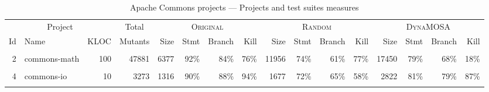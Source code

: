 \documentclass[sigconf]{acmart}
\newcommand{\original}{\textsc{Original}\xspace}
\begin{document}
\begin{table}
\small
  \caption{Apache Commons projects --- Projects and test suites measures}
  \begin{tabular}{|r| l | r | r | r|r|r|r | r|r|r|r | r|r|r|r |}
    \hline
    \multicolumn{3}{|c|}{Project} & 
    \multicolumn{1}{c|}{Total} & 
    \multicolumn{4}{c|}{\original}  & 
    \multicolumn{4}{c|}{\textsc{Random}} &
    \multicolumn{4}{c|}{\textsc{DynaMOSA}}\\

    Id &     Name &    KLOC &
    Mutants &
    Size & Stmt & Branch & Kill &
    Size & Stmt & Branch & Kill &
    Size & Stmt & Branch & Kill \\
    \hline
\cellcolor[HTML]{FFFF00}{1} & \cellcolor[HTML]{FFFF00}{commons-net}             & \cellcolor[HTML]{FFFF00}{20}	  & \cellcolor[HTML]{FFFF00}{5764}	&	\cellcolor[HTML]{FFFF00}{254}		& \cellcolor[HTML]{FFFF00}{33\%} & \cellcolor[HTML]{FFFF00}{28\%} & \cellcolor[HTML]{FFFF00}{28\%}  & \cellcolor[HTML]{FFFF00}{1988}	& \cellcolor[HTML]{FFFF00}{48\%} & \cellcolor[HTML]{FFFF00}{35\%} & \cellcolor[HTML]{FFFF00}{32\%} & \cellcolor[HTML]{FFFF00}{3499}	  & \cellcolor[HTML]{FFFF00}{51\%} & \cellcolor[HTML]{FFFF00}{42\%} & \cellcolor[HTML]{FFFF00}{35\%}\\
2 & commons-math            & 100	  & 47881	& 6377	& 92\% & 84\% & 76\%  & 11956	& 74\% & 61\% & 77\% & 17450	& 79\% & 68\% & 18\% \\
\cellcolor[HTML]{FFFF00}{3} & \cellcolor[HTML]{FFFF00}{commons-lang}            & \cellcolor[HTML]{FFFF00}{28} 		& \cellcolor[HTML]{FFFF00}{13061}	& \cellcolor[HTML]{FFFF00}{4114}	& \cellcolor[HTML]{FFFF00}{95\%} & \cellcolor[HTML]{FFFF00}{91\%} & \cellcolor[HTML]{FFFF00}{66\%}  & \cellcolor[HTML]{FFFF00}{4500}	& \cellcolor[HTML]{FFFF00}{73\%} & \cellcolor[HTML]{FFFF00}{60\%} & \cellcolor[HTML]{FFFF00}{72\%} & \cellcolor[HTML]{FFFF00}{9027}	  & \cellcolor[HTML]{FFFF00}{89\%} & \cellcolor[HTML]{FFFF00}{86\%} & \cellcolor[HTML]{FFFF00}{86\%} \\
4 & commons-io              & 10 	  & 3273	&	1316	& 90\% & 88\% & 94\%  & 1677	& 72\% & 65\% & 58\% & 2822	  & 81\% & 79\% & 87\% \\
\cellcolor[HTML]{FFFF00}{5} & \cellcolor[HTML]{FFFF00}{commons-imaging}         & \cellcolor[HTML]{FFFF00}{31} 	  & \cellcolor[HTML]{FFFF00}{11597}	&	\cellcolor[HTML]{FFFF00}{563}		& \cellcolor[HTML]{FFFF00}{73\%} & \cellcolor[HTML]{FFFF00}{59\%} & \cellcolor[HTML]{FFFF00}{47\%}  & \cellcolor[HTML]{FFFF00}{2974}	& \cellcolor[HTML]{FFFF00}{63\%} & \cellcolor[HTML]{FFFF00}{45\%} & \cellcolor[HTML]{FFFF00}{44\%} & \cellcolor[HTML]{FFFF00}{4935}	  & \cellcolor[HTML]{FFFF00}{67\%} & \cellcolor[HTML]{FFFF00}{53\%} & \cellcolor[HTML]{FFFF00}{45\%} \\

\end{tabular}
\end{table}
\end{document}
